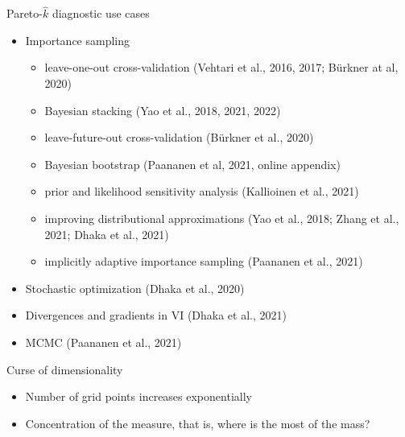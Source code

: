 \documentclass[english,t]{beamer}
\begin{document}
\begin{frame}{Pareto-$\hat{k}$ diagnostic use cases}

  \vspace{-.5\baselineskip}
  \begin{itemize}
  \item Importance sampling
    \begin{itemize}
    \item leave-one-out cross-validation (Vehtari et al., 2016, 2017; Bürkner at al, 2020)
    \item Bayesian stacking (Yao et al., 2018, 2021, 2022)
    \item leave-future-out cross-validation (Bürkner et al., 2020)
    \item Bayesian bootstrap (Paananen et al, 2021, online appendix)
    \item prior and likelihood sensitivity analysis (Kallioinen et al., 2021)
    \item improving distributional approximations (Yao et al., 2018; Zhang et al., 2021; Dhaka et al., 2021)
    \item implicitly adaptive importance sampling (Paananen et al., 2021)
    \end{itemize}
  \item Stochastic optimization (Dhaka et al., 2020)
  \item Divergences and gradients in VI (Dhaka et al., 2021)
  \item MCMC (Paananen et al., 2021)
  \end{itemize}

\end{frame}

\begin{frame}{Curse of dimensionality}

  \begin{itemize}
  \item Number of grid points increases exponentially
  \item Concentration of the measure, that is, where is the most of the
    mass?
  \end{itemize}

\end{frame}
\end{document}
